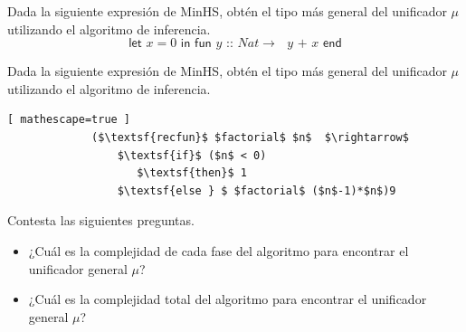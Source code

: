 \bigskip

   \begin{exercise} Dada la siguiente expresión de \textsf{MinHS}, obtén el tipo más general del unificador $\mu$ utilizando el algoritmo de inferencia.
	\[
		\textsf{let $x = 0$ in fun $y$ :: $Nat \rightarrow$  $y$ + $x$ end}
	\]
   \end{exercise}

\bigskip
     \begin{exercise} Dada la siguiente expresión de \textsf{MinHS}, obtén el tipo más general del unificador $\mu$ utilizando el algoritmo de inferencia.
          \begin{lstlisting}[ mathescape=true ]
             ($\textsf{recfun}$ $factorial$ $n$  $\rightarrow$
                 $\textsf{if}$ ($n$ < 0) 
                    $\textsf{then}$ 1
                 $\textsf{else } $ $factorial$ ($n$-1)*$n$)9
           \end{lstlisting}
     \end{exercise}

\bigskip

   \begin{exercise} Contesta las siguientes preguntas.\\
	\begin{itemize}
	    \item ¿Cuál es la complejidad de cada fase del algoritmo para encontrar el unificador general $\mu$?\\
           \item ¿Cuál es la complejidad total del algoritmo para encontrar el unificador general $\mu$?
	\end{itemize}
   \end{exercise}
